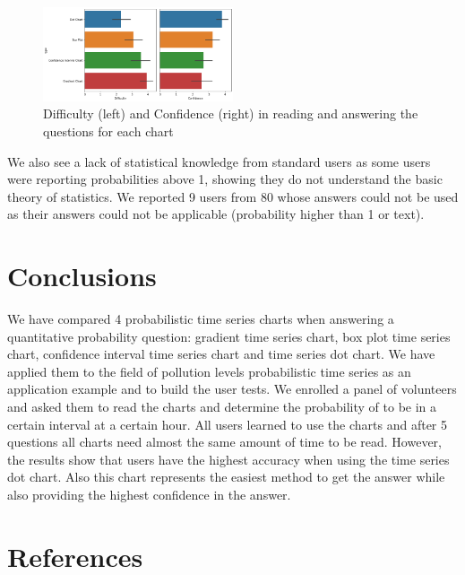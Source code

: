\documentclass[a4paper,3p,sort&compress]{elsarticle}
\begin{document}
\begin{figure}
  \centering
   \includegraphics[width=0.5\textwidth]{confi_load}
  \caption{\label{figure:confi_load} Difficulty (left) and Confidence (right) in reading and answering the questions for each chart}
\end{figure}

We also see a lack of statistical knowledge from standard users as some users were reporting 
probabilities above 1, showing they do not understand the basic theory of statistics. 
We reported 9 users from 80 whose answers could not be used as their answers could not be 
applicable (probability higher than 1 or text).

\section{Conclusions}
\label{sec:concl}

We have compared 4 probabilistic time 
series charts when answering a quantitative probability question: 
gradient time series chart, box plot time series chart, confidence interval 
time series chart and time series dot chart.
We have applied them to the field of \no pollution levels probabilistic 
time series as an application example and to build the user tests.
We enrolled a panel of volunteers and asked them to read the charts 
and determine the probability of \no to be in a certain interval at a certain 
hour.
All users learned to use the charts and after 5 questions all charts 
need almost the same amount 
of time to be read.
However, the results show that users have the highest accuracy when using 
the time series dot chart. Also this chart represents the easiest method 
to get the answer while also providing the highest confidence in the answer.


\section{References}
\label{sec:ref}



\end{document}
